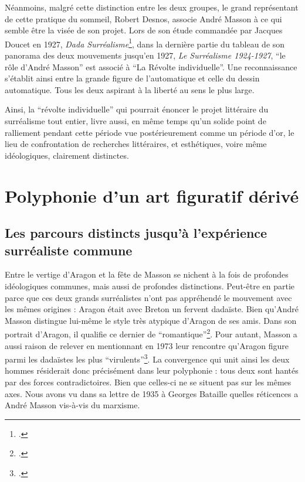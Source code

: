 	Néanmoins, malgré cette distinction entre les deux groupes, le grand représentant de cette pratique du sommeil, Robert Desnos, associe André Masson à ce qui semble être la visée de son projet. Lors de son étude commandée par Jacques Doucet en 1927, \emph{Dada Surréalisme}\footcite[p152]{desnos}, dans la dernière partie du tableau de son panorama des deux mouvements jusqu’en 1927, \emph{Le Surréalisme 1924-1927}, \enquote{le rôle d’André Masson} est associé à \enquote{La Révolte individuelle}. Une reconnaissance s’établit ainsi entre la grande figure de l’automatique et celle du dessin automatique. Tous les deux aspirant à la liberté au sens le plus large. 

	Ainsi, la \enquote{révolte individuelle} qui pourrait énoncer le projet littéraire du surréalisme tout entier, livre aussi, en même temps qu’un solide point de ralliement pendant cette période vue postérieurement comme un période d’or, le lieu de confrontation de recherches littéraires, et esthétiques, voire même idéologiques, clairement distinctes. 

\section{Polyphonie d'un art figuratif dérivé}

\subsection{Les parcours distincts jusqu'à l'expérience surréaliste commune}


Entre le vertige d’Aragon et la fête de Masson se nichent à la fois de profondes idéologiques communes, mais aussi de profondes distinctions. Peut-être en partie parce que ces deux grands surréalistes n’ont pas appréhendé le mouvement avec les mêmes origines : Aragon était avec Breton un fervent dadaïste. Bien qu’André Masson distingue lui-même le style très atypique d’Aragon de ses amis. Dans son portrait d’Aragon, il qualifie ce dernier de \enquote{romantique}\footcite{desnos}. Pour autant, Masson a aussi raison de relever en mentionnant en 1973 leur rencontre qu’Aragon figure parmi les dadaïstes les plus \enquote{virulents}\footcite[p84]{rebelle}. La convergence qui unit ainsi les deux hommes résiderait donc précisément dans leur polyphonie : tous deux sont hantés par des forces contradictoires. Bien que celles-ci ne se situent pas sur les mêmes axes. Nous avons vu dans sa lettre de 1935 à Georges Bataille quelles réticences a André Masson vis-à-vis du marxisme. 

